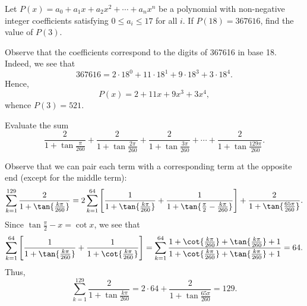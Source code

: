 \begin{question}[521]\label{Q::2024-S-1-21}
    Let $P(x) = a_0 + a_1 x + a_2 x^2 + \cdots + a_n x^n$ be a polynomial with non-negative integer coefficients satisfying $0 \leq a_i \leq 17$ for all $i$. If $P(18) = 367616$, find the value of $P(3)$.
\end{question}
\begin{solution*}
    Observe that the coefficients correspond to the digits of 367616 in base 18. Indeed, we see that \[367616 = 2 \cdot 18^0 + 11 \cdot 18^1 + 9 \cdot 18^3 + 3 \cdot 18^4.\] Hence, \[P(x) = 2 + 11x + 9x^3 + 3x^4,\] whence $P(3) = 521$.
\end{solution*}

\begin{question}[129]\label{Q::2024-S-1-22}
    Evaluate the sum \[\frac{2}{1 + \tan{\frac{\pi}{260}}} + \frac{2}{1 + \tan{\frac{2\pi}{260}}} + \frac{2}{1 + \tan{\frac{3\pi}{260}}} + \cdots + \frac{2}{1 + \tan{\frac{129\pi}{260}}}.\]
\end{question}
\begin{solution*}
    Observe that we can pair each term with a corresponding term at the opposite end (except for the middle term): \[\sum_{k = 1}^{129} \frac{2}{1 + \tan{\frac{k\pi}{260}}} = 2\sum_{k = 1}^{64} \bs{\frac{1}{1 + \tan{\frac{k\pi}{260}}} + \frac{1}{1 + \tan{\frac\pi2 - \frac{k\pi}{260}}}} + \frac{2}{1 + \tan{\frac{65\pi}{260}}}.\] Since $\tan{\frac\pi2 - x} = \cot x$, we see that \[\sum_{k = 1}^{64} \bs{\frac{1}{1 + \tan{\frac{k\pi}{260}}} + \frac{1}{1 + \cot{\frac{k\pi}{260}}}} = \sum_{k = 1}^{64} \frac{1 + \cot{\frac{k\pi}{260}} + \tan{\frac{k\pi}{260}} + 1}{1 + \cot{\frac{k\pi}{260}} + \tan{\frac{k\pi}{260}} + 1} = 64.\] Thus, \[\sum_{k = 1}^{129} \frac{2}{1 + \tan{\frac{k\pi}{260}}} = 2 \cdot 64 + \frac{2}{1 + \tan{\frac{65\pi}{260}}} = 129.\]
\end{solution*}

